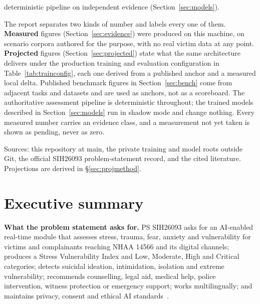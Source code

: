 \documentclass[11pt,a4paper]{article}
\newcommand{\codeus}{\textunderscore\allowbreak}
\DeclareRobustCommand{\code}[1]{{\ttfamily\let\_\codeus #1}}
\begin{document}
\begin{titlepage}
\begin{keybox}[title={The one-paragraph version}]
deterministic pipeline on independent evidence (Section~\ref{sec:models}).
\end{keybox}
\vspace{0.4cm}
\begin{keybox}[title={How to read this analysis}]
\small
The report separates two kinds of number and labels every one of them. \textbf{Measured} figures
(Section~\ref{sec:evidence}) were produced on this machine, on scenario corpora authored for the
purpose, with no real victim data at any point. \textbf{Projected} figures
(Section~\ref{sec:projected}) state what the same architecture delivers under the production training
and evaluation configuration in Table~\ref{tab:trainconfig}, each one derived from a published anchor
and a measured local delta. Published benchmark figures in Section~\ref{sec:bench} come from adjacent
tasks and datasets and are used as anchors, not as a scoreboard. The authoritative assessment
pipeline is deterministic throughout; the trained models described in Section~\ref{sec:models} run
in shadow mode and change nothing. Every measured number carries an evidence class, and a
measurement not yet taken is shown as pending, never as zero.
\end{keybox}
\vfill
{\small\color{sahaygray} Sources: this repository at \code{main}, the private training
and model roots outside Git, the official SIH26093 problem-statement record, and the cited literature.
Projections are derived in \S\ref{sec:projmethod}.\par}
\end{titlepage}
\tableofcontents
\newpage
{}

\section{Executive summary}

\textbf{What the problem statement asks for.} PS SIH26093 asks for an AI-enabled real-time module
that assesses stress, trauma, fear, anxiety and vulnerability for victims and complainants reaching
NHAA 14566 and its digital channels; produces a Stress Vulnerability Index and Low, Moderate, High
and Critical categories; detects suicidal ideation, intimidation, isolation and extreme
vulnerability; recommends counselling, legal aid, medical help, police intervention, witness
protection or emergency support; works multilingually; and maintains privacy, consent and ethical AI
standards~\cite{sih26093}.
\end{document}
